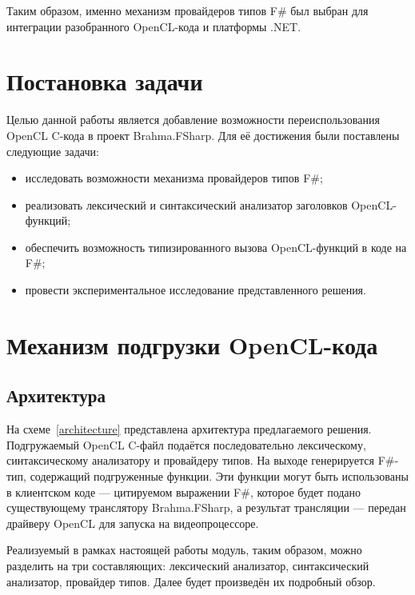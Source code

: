 Таким образом, именно механизм провайдеров типов F\# был выбран для интеграции разобранного OpenCL-кода и платформы .NET.

\section{Постановка задачи}

Целью данной работы является добавление возможности переиспользования OpenCL C-кода в проект Brahma.FSharp. Для её достижения были поставлены следующие задачи:

\begin{itemize}
    \item исследовать возможности механизма провайдеров типов F\#;
    \item реализовать лексический и синтаксический анализатор заголовков OpenCL-функций;
    \item обеспечить возможность типизированного вызова OpenCL-функций в коде на F\#;
    \item провести экспериментальное исследование представленного решения.
\end{itemize}


\section{Механизм подгрузки OpenCL-кода}

\subsection{Архитектура}
На схеме~\ref{architecture} представлена архитектура предлагаемого решения. Подгружаемый OpenCL C-файл подаётся последовательно лексическому, синтаксическому анализатору и провайдеру типов. На выходе генерируется F\#-тип, содержащий подгруженные функции. Эти функции могут быть использованы в клиентском коде --- цитируемом выражении F\#, которое будет подано существующему транслятору Brahma.FSharp, а результат трансляции --- передан драйверу OpenCL для запуска на видеопроцессоре.

Реализуемый в рамках настоящей работы модуль, таким образом, можно разделить на три составляющих: лексический анализатор, синтаксический анализатор, провайдер типов. Далее будет произведён их подробный обзор.


